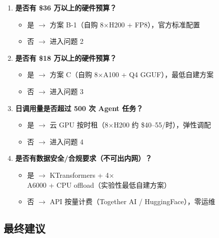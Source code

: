 \documentclass[UTF8,a4paper,10pt,oneside]{ctexart}
\begin{document}
\begin{enumerate}
    \item \textbf{是否有 \$36 万以上的硬件预算？}
    \begin{itemize}
        \item 是 $\rightarrow$ 方案 B-1（自购 8$\times$H200 + FP8），官方标准配置
        \item 否 $\rightarrow$ 进入问题 2
    \end{itemize}
    \item \textbf{是否有 \$18 万以上的硬件预算？}
    \begin{itemize}
        \item 是 $\rightarrow$ 方案 C（自购 8$\times$A100 + Q4 GGUF），最低自建方案
        \item 否 $\rightarrow$ 进入问题 3
    \end{itemize}
    \item \textbf{日调用量是否超过 500 次 Agent 任务？}
    \begin{itemize}
        \item 是 $\rightarrow$ 云 GPU 按时租（8$\times$H200 约 \$40--55/时），弹性调配
        \item 否 $\rightarrow$ 进入问题 4
    \end{itemize}
    \item \textbf{是否有数据安全/合规要求（不可出内网）？}
    \begin{itemize}
        \item 是 $\rightarrow$ KTransformers + 4$\times$A6000 + CPU offload（实验性最低自建方案）
        \item 否 $\rightarrow$ API 按量计费（Together AI / HuggingFace），零运维
    \end{itemize}
\end{enumerate}

\subsection{最终建议}
\end{document}
